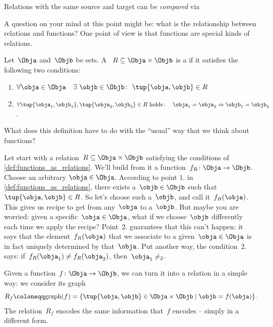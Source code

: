 \begin{remark}
  Relations with the same source and target can be \emph{compared} via 
\end{remark}
A question on your mind at this point might be: what is the relationship between relations and functions? One point of view is that functions are special kinds of relations.

\begin{definition}
  \label{def:functions_as_relations}
  Let~$\Obja$ and~$\Objb$ be sets. A ~$R \subseteq \Obja \times \Objb$ is a \textbf{} if it satisfies the following two conditions:
  \begin{enumerate}
    \item $\forall \obja \in \Obja \quad \exists \ \objb \in \Objb\colon  \ \tup{\obja,\objb} \in R$
    \item $\forall \tup{\obja_1, \objb_1}, \tup{\obja_2, \objb_2} \in R  \text{ holds}\colon \quad \obja_1 = \obja_2 \Rightarrow \objb_1 = \objb_2$.
  \end{enumerate}
\end{definition}

What does this definition have to do with the ``usual'' way that we think about functions?

Let start with a relation~$R \subseteq \Obja \times \Objb$ satisfying the conditions of \cref{def:functions_as_relations}. We'll build from it a function~$f_R \colon \Obja \to \Objb$. Choose an arbitrary $\obja \in \Obja$. According to point $1.$ in \cref{def:functions_as_relations}, there exists a~$\objb \in \Objb$ such that~$\tup{\obja,\objb} \in R$. So let's choose such a~$\objb$, and call it~$f_R(\obja)$. This gives us recipe to get from any~$\obja$ to a~$\objb$. But maybe you are worried: given a specific~$\obja \in \Obja$, what if we choose~$\objb$ differently each time we apply the recipe? Point~$2.$ guarantees that this can't happen: it says that the element~$f_R(\obja)$ that we associate to a given~$\obja \in \Obja$ is in fact uniquely determined by that~$\obja$. Put another way, the condition~$2.$ says: if~$f_R(\obja_1) \neq f_R(\obja_2)$, then~$\obja_1 \neq _2$.

Given a function~$f \colon \Obja \rightarrow \Objb$, we can turn it into a relation in a simple way: we consider its graph
\begin{equation*}
  R_f \coloneqq \text{graph}(f) = \{ \tup{\obja,\objb} \in \Obja \times \Objb \mid \objb= f(\obja) \}.
\end{equation*}
The relation~$R_f$ encodes the same information that~$f$ encodes -- simply in a different form.

